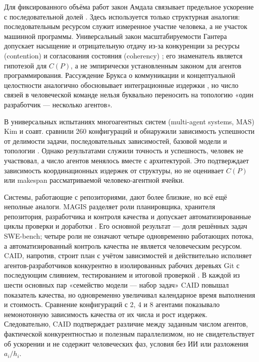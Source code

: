 Для фиксированного объёма работ закон Амдала связывает предельное ускорение с последовательной долей \cite{amdahl1967validity}. Здесь используется только структурная аналогия: последовательным ресурсом служит измеренное участие человека, а не участок машинной программы. Универсальный закон масштабируемости Гантера допускает насыщение и отрицательную отдачу из-за конкуренции за ресурсы (contention) и согласования состояния (coherency) \cite{gunther2008general}; его знаменатель является гипотезой для $C(P)$, а не эмпирически установленным законом для агентов программирования. Рассуждение Брукса о коммуникации и концептуальной целостности аналогично обосновывает интеграционные издержки \cite{brooks1995mythical}, но число связей в человеческой команде нельзя буквально переносить на топологию «один разработчик --- несколько агентов».

В универсальных испытаниях многоагентных систем (multi-agent systems, MAS) Kim и соавт. сравнили 260 конфигураций и обнаружили зависимость успешности от делимости задачи, последовательных зависимостей, базовой модели и топологии \cite{kim2025scaling}. Однако результатами служили точность и успешность, человек не участвовал, а число агентов менялось вместе с архитектурой. Это подтверждает зависимость координационных издержек от структуры, но не оценивает $C(P)$ или makespan рассматриваемой человеко-агентной ячейки.

Системы, работающие с репозиториями, дают более близкие, но всё ещё неполные аналоги. MAGIS разделяет роли планировщика, хранителя репозитория, разработчика и контроля качества и допускает автоматизированные циклы проверки и доработки \cite{tao2024magis}. Его основной результат --- доля решённых задач SWE-bench; четыре роли не означают четыре одновременно работающих потока, а автоматизированный контроль качества не является человеческим ресурсом. CAID, напротив, строит план с учётом зависимостей и действительно исполняет агентов-разработчиков конкурентно в изолированных рабочих деревьях Git с последующим слиянием, тестированием и итоговой проверкой \cite{geng2026caid}. В каждой из шести основных пар «семейство модели --- набор задач» CAID повышал показатель качества, но одновременно увеличивал календарное время выполнения и стоимость. Сравнение конфигураций с 2, 4 и 8 агентами показывало немонотонную зависимость качества от их числа и рост издержек. Следовательно, CAID подтверждает различие между заданным числом агентов, фактической конкурентностью и полезным параллелизмом, но не свидетельствует об ускорении и не содержит человеческих фаз, условия без ИИ или разложения $a_i/h_i$.


